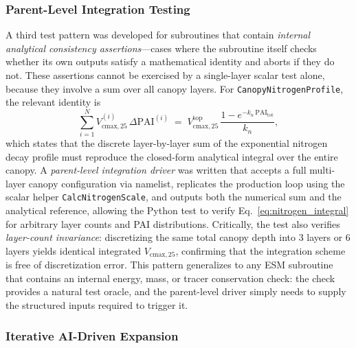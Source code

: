 \subsubsection{Parent-Level Integration Testing}

A third test pattern was developed for subroutines that contain \emph{internal
analytical consistency assertions}—cases where the subroutine itself checks whether
its own outputs satisfy a mathematical identity and aborts if they do not.  These
assertions cannot be exercised by a single-layer scalar test alone, because they
involve a sum over all canopy layers.  For \texttt{CanopyNitrogenProfile}, the
relevant identity is
\begin{equation}
  \sum_{i=1}^{N} V_{\mathrm{cmax},25}^{(i)}\,\Delta\mathrm{PAI}^{(i)}
  \;=\;
  V_{\mathrm{cmax},25}^{\mathrm{top}}
  \,\frac{1 - e^{-k_n\,\mathrm{PAI}_{\mathrm{tot}}}}{k_n},
  \label{eq:nitrogen_integral}
\end{equation}
which states that the discrete layer-by-layer sum of the exponential nitrogen
decay profile must reproduce the closed-form analytical integral over the entire
canopy.  A \emph{parent-level integration driver} was written that accepts a full
multi-layer canopy configuration via namelist, replicates the production loop using
the scalar helper \texttt{CalcNitrogenScale}, and outputs both the numerical sum
and the analytical reference, allowing the Python test to verify Eq.\
\eqref{eq:nitrogen_integral} for arbitrary layer counts and PAI distributions.
Critically, the test also verifies \emph{layer-count invariance}: discretizing the
same total canopy depth into 3 layers or 6 layers yields identical integrated
$V_{\mathrm{cmax},25}$, confirming that the integration scheme is free of
discretization error.  This pattern generalizes to any ESM subroutine that
contains an internal energy, mass, or tracer conservation check: the check provides
a natural test oracle, and the parent-level driver simply needs to supply the
structured inputs required to trigger it.

\subsubsection{Iterative AI-Driven Expansion}

